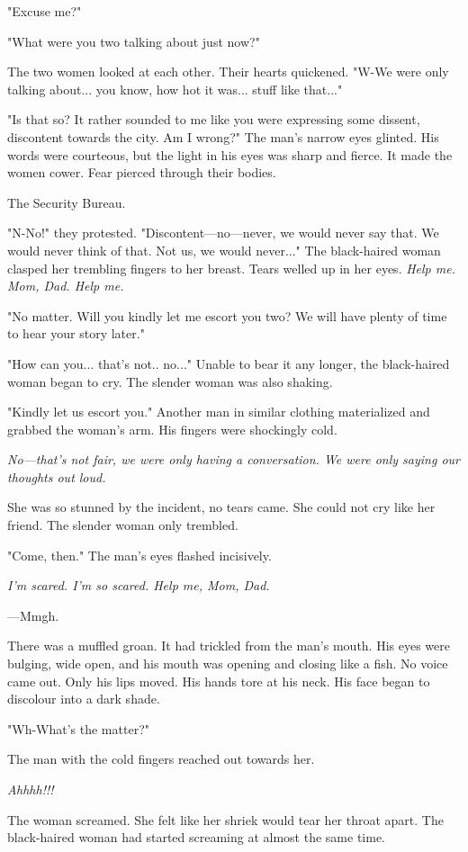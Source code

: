 "Excuse me?"

"What were you two talking about just now?"

The two women looked at each other. Their hearts quickened. "W-We were
only talking about... you know, how hot it was... stuff like that..."

"Is that so? It rather sounded to me like you were expressing some
dissent, discontent towards the city. Am I wrong?" The man's narrow eyes
glinted. His words were courteous, but the light in his eyes was sharp
and fierce. It made the women cower. Fear pierced through their bodies.

The Security Bureau.

"N-No!" they protested. "Discontent---no---never, we would never say that.
We would never think of that. Not us, we would never..." The
black-haired woman clasped her trembling fingers to her breast. Tears
welled up in her eyes. \emph{Help me. Mom, Dad. Help me.}

"No matter. Will you kindly let me escort you two? We will have plenty
of time to hear your story later."

"How can you... that's not.. no..." Unable to bear it any longer, the
black-haired woman began to cry. The slender woman was also shaking.

"Kindly let us escort you." Another man in similar clothing materialized
and grabbed the woman's arm. His fingers were shockingly cold.

\emph{No---that's not fair, we were only having a conversation. We were only
saying our thoughts out loud.}

She was so stunned by the incident, no tears came. She could not cry
like her friend. The slender woman only trembled.

"Come, then." The man's eyes flashed incisively.

\emph{I'm scared. I'm so scared. Help me, Mom, Dad.}

---Mmgh.

There was a muffled groan. It had trickled from the man's mouth. His
eyes were bulging, wide open, and his mouth was opening and closing like
a fish. No voice came out. Only his lips moved. His hands tore at his
neck. His face began to discolour into a dark shade.

"Wh-What's the matter?"

The man with the cold fingers reached out towards her.

\emph{Ahhhh!!!}

The woman screamed. She felt like her shriek would tear her throat
apart. The black-haired woman had started screaming at almost the same
time.

